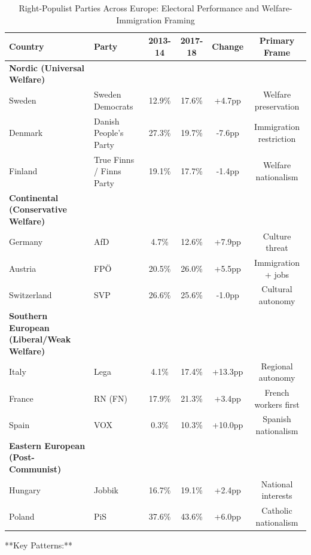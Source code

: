 \begin{table}[h]
\centering
\caption{Right-Populist Parties Across Europe: Electoral Performance and Welfare-Immigration Framing}
\label{tab:rightpop-europe}
\small
\begin{tabular}{llcccc}
\toprule
\textbf{Country} & \textbf{Party} & \textbf{2013-14} & \textbf{2017-18} & \textbf{Change} & \textbf{Primary Frame} \\
\midrule
\textbf{Nordic (Universal Welfare)} \\
Sweden & Sweden Democrats & 12.9\% & 17.6\% & +4.7pp & Welfare preservation \\
Denmark & Danish People's Party & 27.3\% & 19.7\% & -7.6pp & Immigration restriction \\
Finland & True Finns / Finns Party & 19.1\% & 17.7\% & -1.4pp & Welfare nationalism \\
\midrule
\textbf{Continental (Conservative Welfare)} \\
Germany & AfD & 4.7\% & 12.6\% & +7.9pp & Culture threat \\
Austria & FPÖ & 20.5\% & 26.0\% & +5.5pp & Immigration + jobs \\
Switzerland & SVP & 26.6\% & 25.6\% & -1.0pp & Cultural autonomy \\
\midrule
\textbf{Southern European (Liberal/Weak Welfare)} \\
Italy & Lega & 4.1\% & 17.4\% & +13.3pp & Regional autonomy \\
France & RN (FN) & 17.9\% & 21.3\% & +3.4pp & French workers first \\
Spain & VOX & 0.3\% & 10.3\% & +10.0pp & Spanish nationalism \\
\midrule
\textbf{Eastern European (Post-Communist)} \\
Hungary & Jobbik & 16.7\% & 19.1\% & +2.4pp & National interests \\
Poland & PiS & 37.6\% & 43.6\% & +6.0pp & Catholic nationalism \\
\bottomrule
\end{tabular}
\end{table}

**Key Patterns:**

